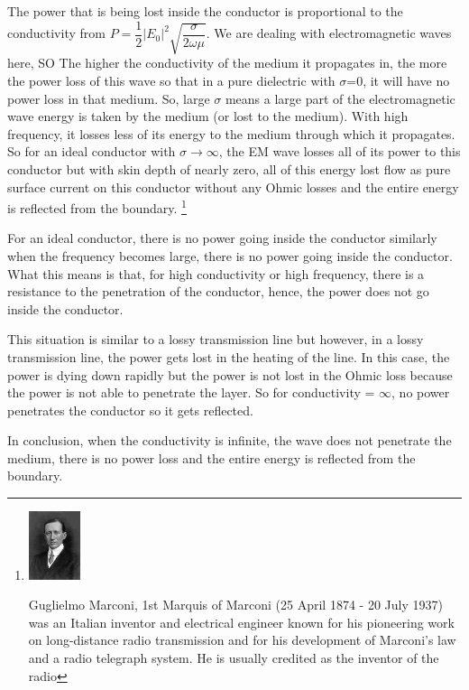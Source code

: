 The power that is being lost inside the conductor is proportional to the conductivity from $P=\dfrac{1}{2}\lvert E_{0}\rvert^{2}\sqrt{\dfrac{\sigma}{2\omega\mu}}$.
We are dealing with electromagnetic waves here, SO The higher the conductivity of the medium it propagates in, the more the power loss of this wave so that in a pure dielectric with $\sigma$=0, it will have no power loss in that medium. So, large $\sigma$ means a large part of the electromagnetic wave energy is taken by the medium (or lost to the medium). With high frequency, it losses less of its energy to the medium through which it propagates. So for an ideal conductor with $\sigma\longrightarrow\infty$, the EM wave losses all of its power to this conductor but with skin depth of nearly zero, all of this energy lost flow as pure surface current on this conductor without any Ohmic losses and the entire energy is reflected from the boundary.
\footnote{
\includegraphics[height=20mm]{graphics/footnotegm.jpg}

Guglielmo Marconi, 1st Marquis of Marconi (25 April 1874 - 20 July 1937) was an Italian inventor and electrical engineer known for his pioneering work on long-distance radio transmission and for his development of Marconi's law and a radio telegraph system. He is usually credited as the inventor of the radio
}

For an ideal conductor, there is no power going inside the conductor similarly when the frequency becomes large, there is no power going inside the conductor. What this means is that, for high conductivity or high frequency, there is a resistance to the penetration of the conductor, hence, the power does not go inside the conductor.

This situation is similar to a lossy transmission line but however, in a lossy transmission line, the power gets lost in the heating of the line. In this case, the power is dying down rapidly but the power is not lost in the Ohmic loss because the power is not able to penetrate the layer. So for conductivity = $\infty$, no power penetrates the conductor so it gets reflected.

In conclusion, when the conductivity is infinite, the wave does not penetrate the medium, there is no power loss and the entire energy is reflected from the boundary.


